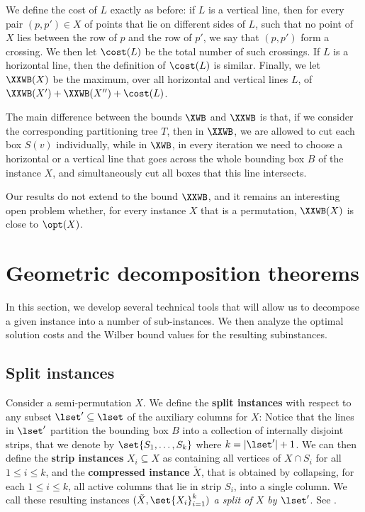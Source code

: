 \documentclass{toc}
\begin{document}
We define the cost of $L$ exactly as before: if $L$ is a vertical line, then for every pair $(p,p')\in X$ of points that lie on different sides of $L$, such that no point of $X$ lies between the row of $p$ and the row of $p'$, we say that $(p,p')$ form a crossing. We then let $\cost(L)$ be the total number of such crossings. If $L$ is a horizontal line, then the definition of $\cost(L)$ is similar. Finally, we let $\XXWB(X)$ be the maximum, over all horizontal and vertical lines $L$, of $\XXWB(X')+\XXWB(X'')+\cost(L)$.

The main difference between the bounds $\XWB$ and $\XXWB$ is that, if we consider the corresponding partitioning tree $T$, then in $\XXWB$, we are allowed to cut each box $S(v)$ individually, while in $\XWB$, in every iteration we need to choose a horizontal or a vertical line that goes across the whole bounding box $B$ of the instance $X$, and simultaneously cut all boxes that this line intersects.

Our results do not extend to the bound $\XXWB$, and it remains an interesting open problem whether, for every instance $X$ that is a permutation, $\XXWB(X)$ is close to $\opt(X)$.
\fi 





%


%


\section{Geometric decomposition theorems} 
\label{sec: decomp}

In this section, we develop several technical tools that will allow us to decompose a given instance into a number of sub-instances. We then analyze the optimal solution costs and the Wilber bound values for the resulting subinstances.
%
%
%


\subsection{Split instances}
\label{sec:split instance} 

Consider a semi-permutation $X$. 
We  define the \textbf{split instances} with respect to any subset $\lset' \subseteq \lset$ of the auxiliary columns for $X$:
Notice that the lines in $\lset'$ partition the bounding box $B$ into a collection of internally disjoint strips, that we denote by $\set{S_1,\ldots,S_k}$ where $k = |\lset'|+1$.
We can then define the \textbf{strip instances} $X_i \subseteq X$ as containing all vertices of $X\cap S_i$ for all $1\leq i\leq k$, and the \textbf{compressed instance} $\tilde X$, that is obtained by collapsing, for each $1\leq i\leq k$, all active columns that lie in strip $S_i$, into a single column.
We  call these resulting instances $(\tilde{X}, \set{X_i}_{i=1}^{k})$  \emph{a split of $X$ by $\lset'$}. 
See . 
\end{document}
